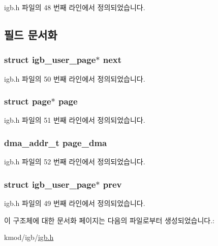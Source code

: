 igb.\+h 파일의 48 번째 라인에서 정의되었습니다.



\subsection{필드 문서화}
\subsubsection[{\texorpdfstring{next}{next}}]{\setlength{\rightskip}{0pt plus 5cm}struct {\bf igb\+\_\+user\+\_\+page}$\ast$ next}\hypertarget{structigb__user__page_a5f0fc326c29a26312987e7c21babb4a2}{}\label{structigb__user__page_a5f0fc326c29a26312987e7c21babb4a2}


igb.\+h 파일의 50 번째 라인에서 정의되었습니다.

\subsubsection[{\texorpdfstring{page}{page}}]{\setlength{\rightskip}{0pt plus 5cm}struct page$\ast$ page}\hypertarget{structigb__user__page_ad45c9283ecdd581420d88bc33100364a}{}\label{structigb__user__page_ad45c9283ecdd581420d88bc33100364a}


igb.\+h 파일의 51 번째 라인에서 정의되었습니다.

\subsubsection[{\texorpdfstring{page\+\_\+dma}{page_dma}}]{\setlength{\rightskip}{0pt plus 5cm}dma\+\_\+addr\+\_\+t page\+\_\+dma}\hypertarget{structigb__user__page_a66dbebc2e3b2bd23d80c63b6aff0c215}{}\label{structigb__user__page_a66dbebc2e3b2bd23d80c63b6aff0c215}


igb.\+h 파일의 52 번째 라인에서 정의되었습니다.

\subsubsection[{\texorpdfstring{prev}{prev}}]{\setlength{\rightskip}{0pt plus 5cm}struct {\bf igb\+\_\+user\+\_\+page}$\ast$ prev}\hypertarget{structigb__user__page_a996875864cd059c92f5d96a65bea4e8b}{}\label{structigb__user__page_a996875864cd059c92f5d96a65bea4e8b}


igb.\+h 파일의 49 번째 라인에서 정의되었습니다.



이 구조체에 대한 문서화 페이지는 다음의 파일로부터 생성되었습니다.\+:\begin{DoxyCompactItemize}
\item 
kmod/igb/\hyperlink{kmod_2igb_2igb_8h}{igb.\+h}\end{DoxyCompactItemize}
